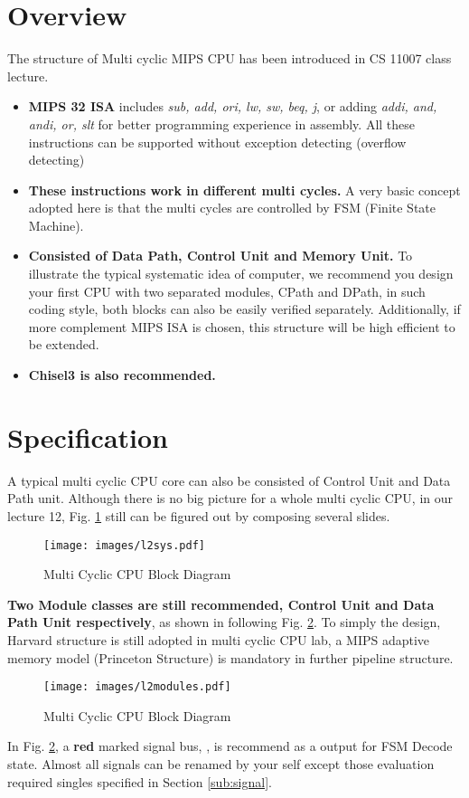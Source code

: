 \documentclass[a4paper]{article}
\begin{document}
\section{Overview} \label{overview}%
The structure of Multi cyclic MIPS CPU has been introduced in CS 11007 class lecture.
\begin{itemize}
	\item{\textbf{MIPS 32 ISA} includes \emph{sub, add, ori, lw, sw, beq, j}, or adding \emph{addi, and, andi, or, slt} for better programming experience in assembly. All these instructions can be supported without exception detecting (overflow detecting)}
    \item{\textbf{These instructions work in different multi cycles.} A very basic concept adopted here is that the multi cycles are controlled by FSM (Finite State Machine).}
    \item{\textbf{Consisted of Data Path, Control Unit and Memory Unit.} To illustrate the typical systematic idea of computer, we recommend you design your first CPU with two separated modules, CPath and DPath, in such coding style, both blocks can also be easily verified separately. Additionally, if more complement MIPS ISA is chosen, this structure will be high efficient to be extended.}
    \item{\textbf{Chisel3 is also recommended.}}
\end{itemize}


\newpage
\section{Specification} \label{Specification}%
A typical multi cyclic CPU core can also be consisted of Control Unit and Data Path unit. Although there is no big picture for a whole multi cyclic CPU, in our lecture 12, Fig. \ref{fig:multiblock} still can be figured out by composing several slides. 
\begin{figure}[ht]
 \centering
 \texttt{[image: images/l2sys.pdf]}
 \caption{Multi Cyclic CPU Block Diagram}
 \label{fig:multiblock}
\end{figure}

\textbf{Two Module classes are still recommended, Control Unit and Data Path Unit respectively}, as shown in following Fig. \ref{fig:modules}. To simply the design, Harvard structure is still adopted in multi cyclic CPU lab, a MIPS adaptive memory model (Princeton Structure) is mandatory in further pipeline structure.  
\begin{figure}[ht]
 \centering
 \texttt{[image: images/l2modules.pdf]}
 \caption{Multi Cyclic CPU Block Diagram}
 \label{fig:modules}
\end{figure}
In Fig. \ref{fig:modules}, a \textbf{red} marked signal bus, , is recommend as a  output for FSM Decode state. Almost all signals can be renamed by your self except those evaluation required singles specified in Section \ref{sub:signal}.
\end{document}
